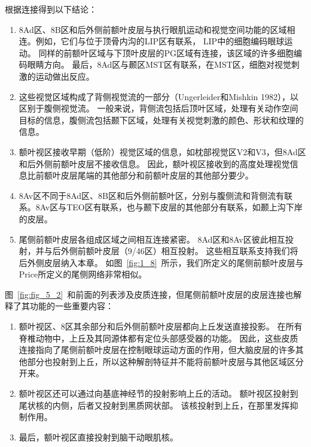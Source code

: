 根据连接得到以下结论：

\begin{enumerate}
	\item 8Ad区、8B区和后外侧前额叶皮层与执行眼肌运动和视觉空间功能的区域相连。例如，它们与位于顶骨内沟的LIP区有联系\cite{cavada1989posterior,andersen1990corticocortical}， LIP中的细胞编码眼球运动\cite{snyder1997coding}。
	同样的前额叶区域与下顶叶皮层的PG区域有连接\cite{cavada1989posterior}，该区域的许多细胞编码眼睛方向\cite{sakata1980spatial}。
	最后，8Ad区与颞区MST区有联系，在MST区，细胞对视觉刺激的运动做出反应\cite{celebrini1995microstimulation}。
	\item 这些视觉区域构成了背侧视觉流的一部分\cite{milner2006visual}（Ungerleider和Mishkin 1982），以区别于腹侧视觉流。
	一般来说，背侧流包括后顶叶区域，处理有关动作空间目标的信息，腹侧流包括颞下区域，处理有关视觉刺激的颜色、形状和纹理的信息。
	\item 额叶视区接收早期（低阶）视觉区域的信息，如枕部视觉区V2和V3\cite{stanton1995topography}，但8Ad区和后外侧前额叶皮层不接收信息。
	因此，额叶视区接收到的高度处理视觉信息比前额叶皮层尾端的其他部分和前额叶皮层的其他部分要少。
	\item 8Av区不同于8Ad区、8B区和后外侧前额叶区，分别与腹侧流和背侧流有联系。8Av区与TEO区有联系\cite{webster1994connections}，也与颞下皮层的其他部分有联系，如颞上沟下岸的皮层\cite{petrides1999dorsolateral}。
	\item 尾侧前额叶皮层各组成区域之间相互连接紧密。
	8Ad区和8Av区彼此相互投射，并与后外侧前额叶皮层（9/46区）相互投射。
	这些相互联系支持我们将后外侧皮层纳入本章。
	如图~\ref{fig:1_8}~所示，我们所定义的尾侧前额叶皮层与Price\cite{price2010neurocircuitry}所定义的尾侧网络非常相似。
\end{enumerate}



图~\ref{fig:fig_5_2}~和前面的列表涉及皮质连接，但尾侧前额叶皮层的皮层连接也解释了其功能的一些重要内容：


\begin{enumerate}
	\item 额叶视区\cite{kunzle1976projection,huerta1986frontal}、8区其余部分\cite{fries1984cortical}和后外侧前额叶皮层\cite{selemon1988common}都向上丘发送直接投影。
	在所有脊椎动物中，上丘及其同源体都有定位头部感受器的功能。
	因此，这些皮质连接指向了尾侧前额叶皮层在控制眼球运动方面的作用，但大脑皮层的许多其他部分也投射到上丘\cite{leichnetz1981prefrontal,fries1984cortical}，所以这种解剖特征并不能将前额叶皮层与其他区域区分开来。
	\item 额叶视区还可以通过向基底神经节的投射影响上丘的活动。
	额叶视区投射到尾状核的内侧\cite{stanton1988frontal}，后者又投射到黑质网状部\cite{hedreen1991organization}。
	该核投射到上丘，在那里发挥抑制作用\cite{hikosaka1985modification}。
	\item 最后，额叶视区直接投射到脑干动眼肌核\cite{segraves1992activity,yan2001overlap}。
\end{enumerate}



